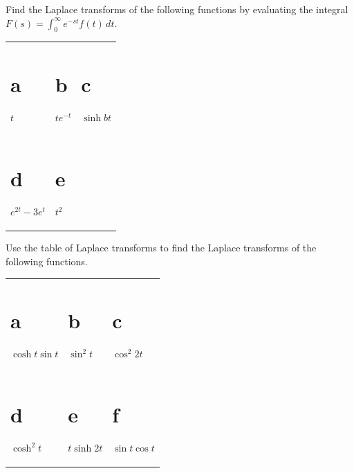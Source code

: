 \exercises

\begin{exerciselist}
  \item\label{exer:8.1.1} Find the Laplace transforms of the following functions by evaluating the
        integral $F(s)=\int_{0}^{\infty}e^{-st}f(t)\,dt$.

  \begin{tabular}[t]{@{}p{112pt}@{}p{112pt}@{}p{112pt}}
    \part{a} $t$             & \part{b} $te^{-t}$ & \part{c} $\sinh bt$ \\
    \part{d} $e^{2t}-3e^{t}$ & \part{e} $t^{2}$
  \end{tabular}

  \item\label{exer:8.1.2} Use the table of Laplace transforms to find the Laplace transforms of the
        following functions.

  \begin{tabular}[t]{@{}p{112pt}@{}p{112pt}@{}p{112pt}}
    \part{a} $\cosh t\sin t$                          & \part{b} $\sin^{2}t$     & \part{c} $\cos^{2}2t$     \\
    \part{d} $\cosh^{2}t$                             & \part{e} $t\sinh2t$      & \part{f} $\sin t\cos t$   \\

\end{tabular}
\end{exerciselist}
